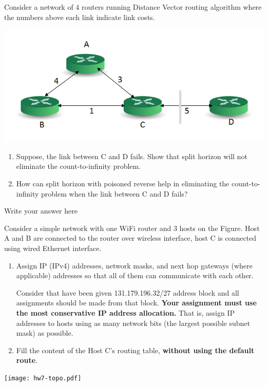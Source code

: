 \documentclass{report}
\begin{document}
\begin{problem}

Consider a network of 4 routers running Distance Vector routing algorithm where the numbers above each link indicate link costs.
\begin{center}
\includegraphics[scale=0.4]{hw7-q2.jpg}
\end{center}

\begin{enumerate}
\item Suppose, the link between C and D fails. Show that split horizon will not eliminate the count-to-infinity problem.
\item How can split horizon with poisoned reverse help in eliminating the count-to-infinity problem when the link between C and D fails?
\end{enumerate}

\begin{answer}{30em}
    Write your answer here
\end{answer}

\end{problem}


\newpage



\begin{problem}
Consider a simple network with one WiFi router and 3 hosts on the Figure.  Host A and B are connected to the router over wireless interface, host C is connected using wired Ethernet interface.


\begin{enumerate}
\item Assign IP (IPv4) addresses, network masks, and next hop gateways (where applicable) addresses so that all of them can communicate with each other.

Consider that have been given 131.179.196.32/27 address block and all assignments should be made from that block. \textbf{Your assignment must use the most conservative IP address allocation.} That is, assign IP addresses to hosts using as many network bits (the largest possible subnet mask) as possible.

\item Fill the content of the Host C's routing table, \textbf{without using the default route}.
\end{enumerate}

\vspace{1cm}

\texttt{[image: hw7-topo.pdf]}

\end{problem}
\end{document}
